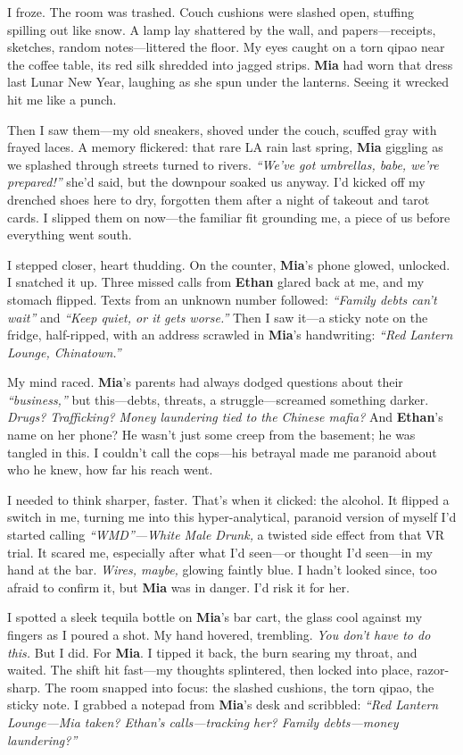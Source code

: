 \documentclass{article}
\begin{document}
I froze. The room was trashed. Couch cushions were slashed open, stuffing spilling out like snow. A lamp lay shattered by the wall, and papers—receipts, sketches, random notes—littered the floor. My eyes caught on a torn qipao near the coffee table, its red silk shredded into jagged strips. \textbf{Mia} had worn that dress last Lunar New Year, laughing as she spun under the lanterns. Seeing it wrecked hit me like a punch.

Then I saw them—my old sneakers, shoved under the couch, scuffed gray with frayed laces. A memory flickered: that rare LA rain last spring, \textbf{Mia} giggling as we splashed through streets turned to rivers. \textit{“We’ve got umbrellas, babe, we’re prepared!”} she’d said, but the downpour soaked us anyway. I’d kicked off my drenched shoes here to dry, forgotten them after a night of takeout and tarot cards. I slipped them on now—the familiar fit grounding me, a piece of us before everything went south.

I stepped closer, heart thudding. On the counter, \textbf{Mia}’s phone glowed, unlocked. I snatched it up. Three missed calls from \textbf{Ethan} glared back at me, and my stomach flipped. Texts from an unknown number followed: \textit{“Family debts can’t wait”} and \textit{“Keep quiet, or it gets worse.”} Then I saw it—a sticky note on the fridge, half-ripped, with an address scrawled in \textbf{Mia}’s handwriting: \textit{“Red Lantern Lounge, Chinatown.”}

My mind raced. \textbf{Mia}’s parents had always dodged questions about their \textit{“business,”} but this—debts, threats, a struggle—screamed something darker. \textit{Drugs? Trafficking? Money laundering tied to the Chinese mafia?} And \textbf{Ethan}’s name on her phone? He wasn’t just some creep from the basement; he was tangled in this. I couldn’t call the cops—his betrayal made me paranoid about who he knew, how far his reach went.

I needed to think sharper, faster. That’s when it clicked: the alcohol. It flipped a switch in me, turning me into this hyper-analytical, paranoid version of myself I’d started calling \textit{“WMD”—White Male Drunk,} a twisted side effect from that VR trial. It scared me, especially after what I’d seen—or thought I’d seen—in my hand at the bar. \textit{Wires, maybe,} glowing faintly blue. I hadn’t looked since, too afraid to confirm it, but \textbf{Mia} was in danger. I’d risk it for her.

I spotted a sleek tequila bottle on \textbf{Mia}’s bar cart, the glass cool against my fingers as I poured a shot. My hand hovered, trembling. \textit{You don’t have to do this.} But I did. For \textbf{Mia}. I tipped it back, the burn searing my throat, and waited. The shift hit fast—my thoughts splintered, then locked into place, razor-sharp. The room snapped into focus: the slashed cushions, the torn qipao, the sticky note. I grabbed a notepad from \textbf{Mia}’s desk and scribbled: \textit{“Red Lantern Lounge—Mia taken? Ethan’s calls—tracking her? Family debts—money laundering?”}
\end{document}
